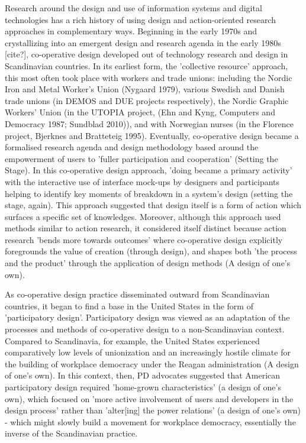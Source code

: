 Research around the design and use of information systems and digital technologies has a rich history of using design and action-oriented research approaches in complementary ways. Beginning in the early 1970s and crystallizing into an emergent design and research agenda in the early 1980s [cite?], co-operative design developed out of technology research and design in Scandinavian countries. In its earliest form, the 'collective resource' approach, this most often took place with workers and trade unions: including the Nordic Iron and Metal Worker's Union (Nygaard 1979), various Swedish and Danish trade unions (in DEMOS and DUE projects respectively),  the Nordic Graphic Workers' Union (in the UTOPIA project, (Ehn and Kyng, Computers and Democracy 1987; Sundblad 2010)), and with Norwegian nurses (in the Florence project, Bjerknes and Bratteteig 1995). Eventually, co-operative design became a formalised research agenda and design methodology based around the empowerment of users to 'fuller participation and cooperation' (Setting the Stage). In this co-operative design approach, 'doing became a primary activity' with the interactive use of interface mock-ups by designers and participants helping to identify key moments of breakdown in a system's design (setting the stage, again). This approach suggested that design itself is a form of action which surfaces a specific set of knowledges. Moreover, although this approach used methods similar to action research, it considered itself distinct because action research 'bends more towards outcomes' where co-operative design explicitly foregrounds the value of creation (through design), and shapes both 'the process and the product' through the application of design methods (A design of one's own). 

As co-operative design practice disseminated outward from Scandinavian countries, it began to find a base in the United States in the form of 'participatory design'. Participatory design was viewed as an adaptation of the processes and methods of co-operative design to a non-Scandinavian context. Compared to Scandinavia, for example, the United States experienced comparatively low levels of unionization and an increasingly hostile climate for the building of workplace democracy under the Reagan administration (A design of one's own). In this context, then, PD advocates suggested that American participatory design required 'home-grown characteristics' (a design of one's own), which focused on 'more active involvement of users and developers in the design process' rather than 'alter[ing] the power relations' (a design of one's own) - which might slowly build a movement for workplace democracy, essentially the inverse of the Scandinavian practice.

